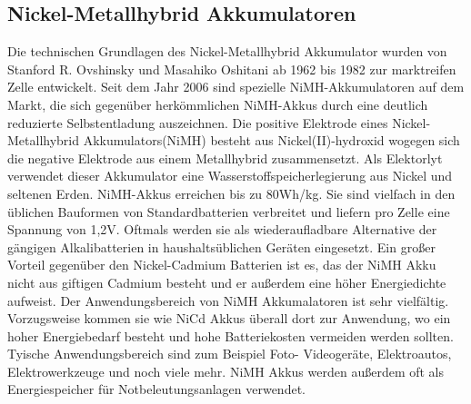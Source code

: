 \subsection{Nickel-Metallhybrid Akkumulatoren}
Die technischen Grundlagen des Nickel-Metallhybrid Akkumulator wurden von Stanford R. Ovshinsky und Masahiko Oshitani ab 1962 bis 1982 zur marktreifen Zelle entwickelt. Seit dem Jahr 2006 sind spezielle NiMH-Akkumulatoren auf dem Markt, die sich gegenüber herkömmlichen NiMH-Akkus durch eine deutlich reduzierte Selbstentladung auszeichnen. Die positive Elektrode eines Nickel-Metallhybrid Akkumulators(NiMH) besteht aus Nickel(II)-hydroxid wogegen sich die negative Elektrode aus einem Metallhybrid zusammensetzt. Als Elektorlyt verwendet dieser Akkumulator eine Wasserstoffspeicherlegierung aus Nickel und seltenen Erden. NiMH-Akkus erreichen bis zu 80Wh/kg. Sie sind vielfach in den üblichen Bauformen von Standardbatterien verbreitet und liefern pro Zelle eine Spannung von 1,2V. Oftmals werden sie als wiederaufladbare Alternative der gängigen Alkalibatterien in haushaltsüblichen Geräten eingesetzt. Ein großer Vorteil gegenüber den Nickel-Cadmium Batterien ist es, das der NiMH Akku nicht aus giftigen Cadmium besteht und er außerdem eine höher Energiedichte aufweist.
Der Anwendungsbereich von NiMH Akkumalatoren ist sehr vielfältig. Vorzugsweise kommen sie wie NiCd Akkus überall dort zur Anwendung, wo ein hoher Energiebedarf besteht und hohe Batteriekosten vermeiden werden sollten. Tyische Anwendungsbereich sind zum Beispiel Foto- Videogeräte, Elektroautos, Elektrowerkzeuge und noch viele mehr. NiMH Akkus werden außerdem oft als Energiespeicher für Notbeleutungsanlagen verwendet.
\newpage
